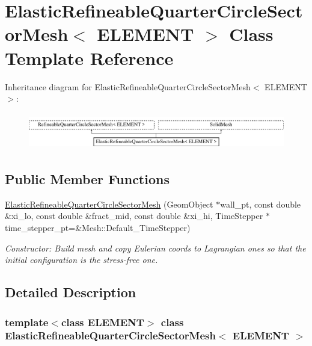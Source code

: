 \hypertarget{classElasticRefineableQuarterCircleSectorMesh}{}\section{Elastic\+Refineable\+Quarter\+Circle\+Sector\+Mesh$<$ E\+L\+E\+M\+E\+NT $>$ Class Template Reference}
\label{classElasticRefineableQuarterCircleSectorMesh}
Inheritance diagram for Elastic\+Refineable\+Quarter\+Circle\+Sector\+Mesh$<$ E\+L\+E\+M\+E\+NT $>$\+:\begin{figure}[H]
\begin{center}
\leavevmode
\includegraphics[height=1.623188cm]{classElasticRefineableQuarterCircleSectorMesh}
\end{center}
\end{figure}
\subsection*{Public Member Functions}
\begin{DoxyCompactItemize}
\item 
\hyperlink{classElasticRefineableQuarterCircleSectorMesh_a123699deecd2a908a7a882a9d2a9f4dd}{Elastic\+Refineable\+Quarter\+Circle\+Sector\+Mesh} (Geom\+Object $\ast$wall\+\_\+pt, const double \&xi\+\_\+lo, const double \&fract\+\_\+mid, const double \&xi\+\_\+hi, Time\+Stepper $\ast$time\+\_\+stepper\+\_\+pt=\&Mesh\+::\+Default\+\_\+\+Time\+Stepper)
\begin{DoxyCompactList}\small\item\em Constructor\+: Build mesh and copy Eulerian coords to Lagrangian ones so that the initial configuration is the stress-\/free one. \end{DoxyCompactList}\end{DoxyCompactItemize}


\subsection{Detailed Description}
\subsubsection*{template$<$class E\+L\+E\+M\+E\+NT$>$\newline
class Elastic\+Refineable\+Quarter\+Circle\+Sector\+Mesh$<$ E\+L\+E\+M\+E\+N\+T $>$}

